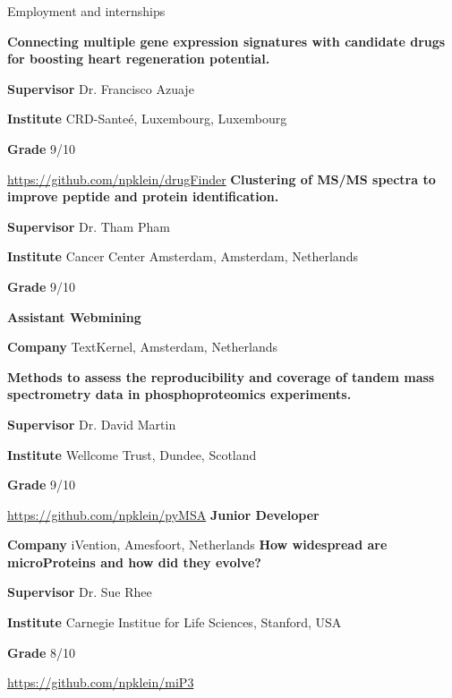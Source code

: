 \begin{rubric}{Employment and internships}
%
%


%
\textbf{Connecting multiple gene expression signatures with candidate drugs for boosting heart regeneration potential.} \par
\textbf{Supervisor} Dr. Francisco Azuaje \par
\textbf{Institute} CRD-Sante\'e, Luxembourg, Luxembourg \par
\textbf{Grade} 9/10 \par
\url{https://github.com/npklein/drugFinder}
%
%
\textbf{Clustering of MS/MS spectra to improve peptide and protein identification.} \par
\textbf{Supervisor} Dr. Tham Pham \par
\textbf{Institute} Cancer Center Amsterdam, Amsterdam, Netherlands\par
\textbf{Grade} 9/10 \par
%
%
\textbf{Assistant Webmining} \par
\textbf{Company} TextKernel, Amsterdam, Netherlands

%


%
\textbf{Methods to assess the reproducibility and coverage of tandem mass spectrometry data in phosphoproteomics experiments.} \par
\textbf{Supervisor} Dr. David Martin \par
\textbf{Institute} Wellcome Trust, Dundee, Scotland \par
\textbf{Grade} 9/10 \par
\url{https://github.com/npklein/pyMSA}
%
%
\textbf{Junior Developer} \par
\textbf{Company} iVention, Amesfoort, Netherlands
%
%
\textbf{How widespread are microProteins and how did they evolve?} \par
\textbf{Supervisor} Dr. Sue Rhee \par
\textbf{Institute} Carnegie Institue for Life Sciences, Stanford, USA \par
\textbf{Grade} 8/10 \par
\url{https://github.com/npklein/miP3}


\end{rubric}